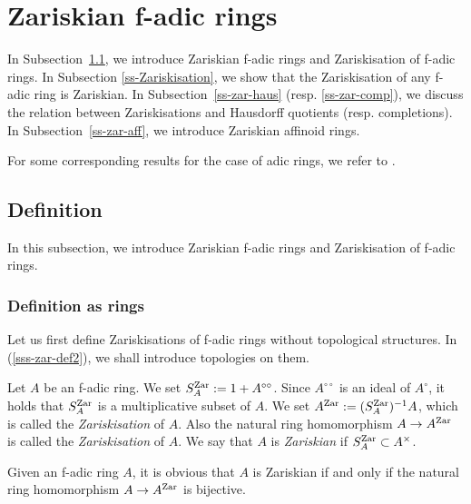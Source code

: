 



\section{Zariskian f-adic rings}

In Subsection~\ref{ss-zar-def}, 
we introduce Zariskian f-adic rings and Zariskisation of f-adic rings. 
In Subsection \ref{ss-Zariskisation}, 
we show that the Zariskisation of any f-adic ring is Zariskian. 
In Subsection~\ref{ss-zar-haus} (resp. \ref{ss-zar-comp}), 
we discuss the relation between Zariskisations and 
Hausdorff quotients (resp. completions). 
In Subsection~\ref{ss-zar-aff}, 
we introduce Zariskian affinoid rings. 

For some corresponding results for the case of adic rings, 
we refer to \cite[Ch. 0, Section 7.3(b) and Ch. I, Section B.1]{FK}. 

\subsection{Definition}\label{ss-zar-def}

In this subsection, we introduce Zariskian f-adic rings and 
Zariskisation of f-adic rings. 


\subsubsection{Definition as rings}\label{sss-zar-def1}

Let us first define Zariskisations of f-adic rings 
without topological structures. 
In (\ref{sss-zar-def2}), we shall introduce topologies on them. 

\begin{dfn}\label{d-zar}
Let $A$ be an f-adic ring. 
We set $S_A^{{\operatorname{Zar}}}:=1+A^{\circ\circ}$. 
Since $A^{\circ\circ}$ is an ideal of $A^{\circ}$, 
it holds that $S_A^{{\operatorname{Zar}}}$ is a multiplicative subset of $A$. 
We set $A^{{\operatorname{Zar}}}:=(S_A^{{\operatorname{Zar}}})^{-1}A$, 
which is called the {\em Zariskisation} of $A$. 
Also the natural ring homomorphism $A \to A^{{\operatorname{Zar}}}$ is 
called the {\em Zariskisation} of $A$. 
We say that $A$ is {\em Zariskian} if $S_A^{{\operatorname{Zar}}} \subset A^{\times}$. 
\end{dfn}



\begin{rem}\label{r-zar1}
Given an f-adic ring $A$, 
it is obvious that $A$ is Zariskian if and only if the natural ring homomorphism 
$A \to A^{{\operatorname{Zar}}}$ is bijective. 
\end{rem}

